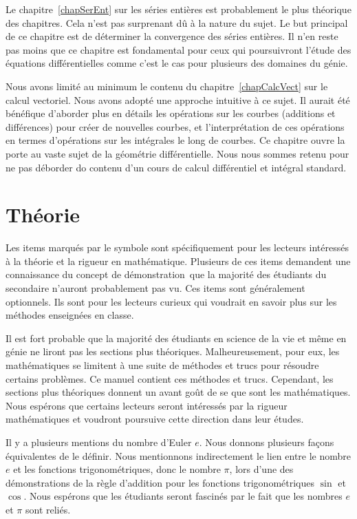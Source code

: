 Le chapitre~\ref{chapSerEnt} sur les séries entières est probablement
le plus théorique des chapitres.  Cela n'est pas surprenant dû à la
nature du sujet.  Le but principal de ce chapitre est de déterminer la
convergence des séries entières.  Il n'en reste pas moins que ce
chapitre est fondamental pour ceux qui poursuivront l'étude des
équations différentielles comme c'est le cas pour plusieurs des
domaines du génie.

Nous avons limité au minimum le contenu du chapitre~\ref{chapCalcVect} sur
le calcul vectoriel.  Nous avons adopté une approche intuitive à ce sujet.
Il aurait été bénéfique d'aborder plus en détails les opérations sur
les courbes (additions et différences) pour créer de nouvelles
courbes, et l'interprétation de ces opérations en termes d'opérations
sur les intégrales le long de courbes.  Ce chapitre ouvre la porte au
vaste sujet de la géométrie différentielle.  Nous nous sommes retenu pour
ne pas déborder do contenu d'un cours de calcul différentiel et intégral
standard.

\section*{Théorie}

Les items marqués par le symbole \theory sont spécifiquement pour les
lecteurs intéressés à la théorie et la rigueur en mathématique.
Plusieurs de ces items demandent une connaissance du concept de \lgm
démonstration\rgm\ que la majorité des étudiants du secondaire
n'auront probablement pas vu.  Ces items sont généralement optionnels.
Ils sont pour les lecteurs curieux qui voudrait en savoir plus sur les
méthodes enseignées en classe.

Il est fort probable que la majorité des étudiants en science de la
vie et même en génie ne liront pas les sections plus théoriques.
Malheureusement, pour eux, les mathématiques se limitent
à une suite de méthodes et trucs pour résoudre certains problèmes.  Ce
manuel contient ces méthodes et trucs.  Cependant, les sections plus
théoriques donnent un avant goût de se que sont les mathématiques.  Nous
espérons que certains lecteurs seront intéressés par la rigueur
mathématiques et voudront poursuive cette direction dans leur études.

Il y a plusieurs mentions du nombre d'Euler $e$.  Nous donnons plusieurs
façons équivalentes de le définir.  Nous mentionnons indirectement le lien
entre le nombre $e$ et les fonctions trigonométriques, donc le nombre
$\pi$, lors d'une des démonstrations de la règle d'addition pour les
fonctions trigonométriques $\sin$ et $\cos$.  Nous espérons que les
étudiants seront fascinés par le fait que les nombres $e$ et $\pi$
sont reliés.


